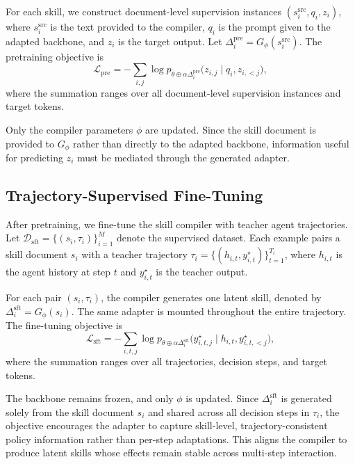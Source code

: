 \documentclass{llmxive}
\begin{document}
For each skill, we construct document-level supervision instances $(s_i^{\mathrm{src}}, q_i, z_i)$, where $s_i^{\mathrm{src}}$ is the text provided to the compiler, $q_i$ is the prompt given to the adapted backbone, and $z_i$ is the target output. Let $\Delta_i^{\mathrm{pre}}=G_\phi(s_i^{\mathrm{src}})$. The pretraining objective is
\begin{equation}
    \mathcal{L}_{\mathrm{pre}}
    =
    -\sum_{i,j}
    \log p_{\theta \oplus \alpha \Delta_i^{\mathrm{pre}}}
    \bigl(z_{i,j} \mid q_i, z_{i,<j}\bigr),
\end{equation}
where the summation ranges over all document-level supervision instances and target tokens.

Only the compiler parameters $\phi$ are updated. Since the skill document is provided to $G_\phi$ rather than directly to the adapted backbone, information useful for predicting $z_i$ must be mediated through the generated adapter.

\subsection{Trajectory-Supervised Fine-Tuning}
\label{sec:sft}

After pretraining, we fine-tune the skill compiler with teacher agent trajectories. Let $\mathcal{D}_{\mathrm{sft}}=\{(s_i,\tau_i)\}_{i=1}^{M}$ denote the supervised dataset. Each example pairs a skill document $s_i$ with a teacher trajectory $\tau_i=\{(h_{i,t}, y_{i,t}^{\star})\}_{t=1}^{T_i}$, where $h_{i,t}$ is the agent history at step $t$ and $y_{i,t}^{\star}$ is the teacher output.

For each pair $(s_i,\tau_i)$, the compiler generates one latent skill, denoted by $\Delta_i^{\mathrm{sft}}=G_\phi(s_i)$. The same adapter is mounted throughout the entire trajectory. The fine-tuning objective is
\begin{equation}
    \mathcal{L}_{\mathrm{sft}}
    =
    -\sum_{i,t,j}
    \log p_{\theta \oplus \alpha \Delta_i^{\mathrm{sft}}}
    \bigl(y_{i,t,j}^{\star}
    \mid h_{i,t}, y_{i,t,<j}^{\star}\bigr),
\end{equation}
where the summation ranges over all trajectories, decision steps, and target tokens.

The backbone remains frozen, and only $\phi$ is updated. Since $\Delta_i^{\mathrm{sft}}$ is generated solely from the skill document $s_i$ and shared across all decision steps in $\tau_i$, the objective encourages the adapter to capture skill-level, trajectory-consistent policy information rather than per-step adaptations. This aligns the compiler to produce latent skills whose effects remain stable across multi-step interaction.
\end{document}
